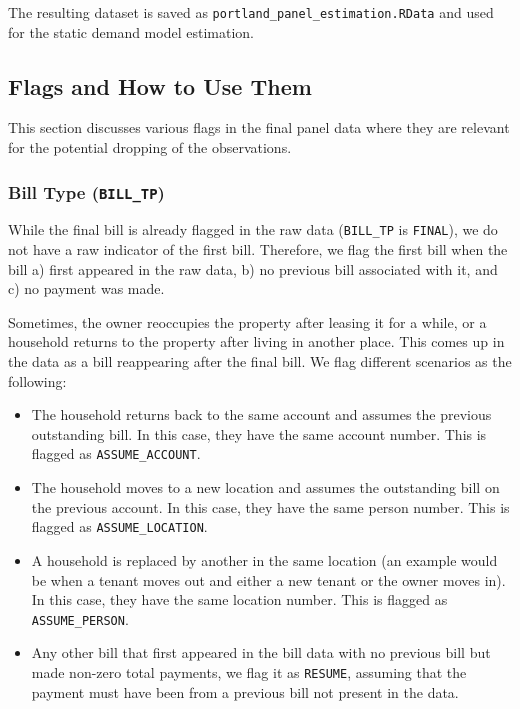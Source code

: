 \documentclass[11pt]{article}
\begin{document}
The resulting dataset is saved as \texttt{portland\_panel\_estimation.RData} and used for the static demand model estimation.

\subsection*{Flags and How to Use Them}

This section discusses various flags in the final panel data where they are relevant for the potential dropping of the observations.

\subsubsection*{Bill Type (\texttt{BILL\_TP})}

While the final bill is already flagged in the raw data (\texttt{BILL\_TP} is \texttt{FINAL}), we do not have a raw indicator of the first bill. Therefore, we flag the first bill when the bill a) first appeared in the raw data, b) no previous bill associated with it, and c) no payment was made.

Sometimes, the owner reoccupies the property after leasing it for a while, or a household returns to the property after living in another place. This comes up in the data as a bill reappearing after the final bill. We flag different scenarios as the following:
\begin{itemize}
	\item The household returns back to the same account and assumes the previous outstanding bill. In this case, they have the same account number. This is flagged as \texttt{ASSUME\_ACCOUNT}.
	\item The household moves to a new location and assumes the outstanding bill on the previous account. In this case, they have the same person number. This is flagged as \texttt{ASSUME\_LOCATION}.
	\item A household is replaced by another in the same location (an example would be when a tenant moves out and either a new tenant or the owner moves in). In this case, they have the same location number. This is flagged as \texttt{ASSUME\_PERSON}.
	\item Any other bill that first appeared in the bill data with no previous bill but made non-zero total payments, we flag it as \texttt{RESUME}, assuming that the payment must have been from a previous bill not present in the data.
\end{itemize}
\end{document}
